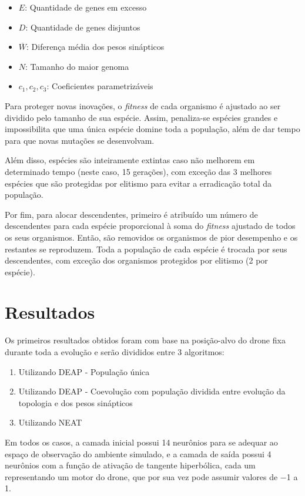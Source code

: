 \documentclass[12pt]{article}
\begin{document}
\begin{itemize}[]
    \item $E$: Quantidade de genes em excesso
    \item $D$: Quantidade de genes disjuntos
    \item $\overline{W}$: Diferença média dos pesos sinápticos
    \item $N$: Tamanho do maior genoma
    \item $ c_1, c_2, c_3$: Coeficientes parametrizáveis
\end{itemize}

Para proteger novas inovações, o \textit{fitness} de cada organismo é ajustado ao ser dividido pelo tamanho de sua espécie. Assim, penaliza-se espécies grandes e impossibilita que uma única espécie domine toda a população, além de dar tempo para que novas mutações se desenvolvam.

Além disso, espécies são inteiramente extintas caso não melhorem em determinado tempo (neste caso, 15 gerações), com exceção das 3 melhores espécies que são protegidas por elitismo para evitar a erradicação total da população.

Por fim, para alocar descendentes, primeiro é atribuído um número de descendentes para cada espécie proporcional à soma do \textit{fitness} ajustado de todos os seus organismos. Então, são removidos os organismos de pior desempenho e os restantes se reproduzem. Toda a população de cada espécie é trocada por seus descendentes, com exceção dos organismos protegidos por elitismo (2 por espécie).

\section{Resultados}
Os primeiros resultados obtidos foram com base na posição-alvo do drone fixa durante toda a evolução e serão divididos entre 3 algoritmos:

\begin{enumerate}
    \item Utilizando DEAP - População única
    \item Utilizando DEAP - Coevolução com população dividida entre evolução da topologia e dos pesos sinápticos
    \item Utilizando NEAT
\end{enumerate}

Em todos os casos, a camada inicial possui 14 neurônios para se adequar ao espaço de observação do ambiente simulado, e a camada de saída possui 4 neurônios com a função de ativação de tangente hiperbólica, cada um representando um motor do drone, que por sua vez pode assumir valores de \num{-1} a \num{1}.
\end{document}
